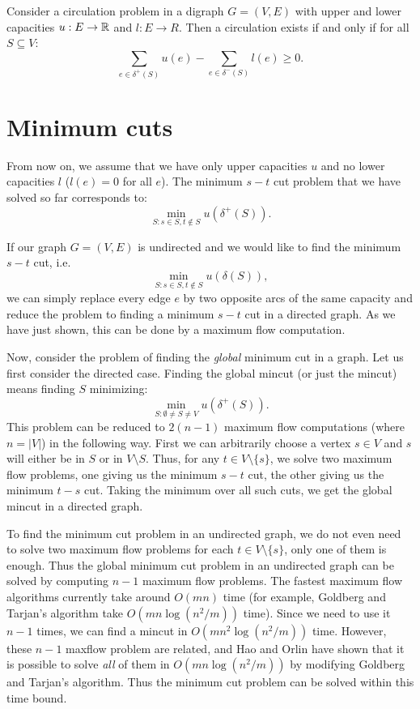 \documentclass[12pt]{article}
\begin{document}
\begin{theorem}
Consider a circulation problem in a digraph $G=(V,E)$ with upper and lower capacities $u: E\rightarrow {\mathbb R}$ and $l: E \rightarrow R$. Then a circulation exists if and only if for all $S\subseteq V$:
$$\sum_{e\in \delta^+(S)} u(e) - \sum_{e\in \delta^-(S)} l(e) \geq 0.$$
\end{theorem}



\section{Minimum cuts}

From now on, we assume that we have only upper capacities $u$ and no
lower capacities $l$ ($l(e)=0$ for all $e$). The minimum $s-t$ cut
problem that we have solved so far corresponds to:
$$\min_{S: s\in S, t\notin S} u(\delta^+(S)).$$

If our graph $G=(V,E)$ is undirected and we would like to find the
minimum $s-t$ cut, i.e.
$$\min_{S: s\in S, t\notin S} u(\delta(S)),$$
we can simply replace every edge $e$ by two opposite arcs of the same
capacity and reduce the problem to finding a minimum $s-t$ cut in a
directed graph. As we have just shown, this can be done by a maximum
flow computation. 

Now, consider the problem of finding the {\it global} minimum cut in a
graph. Let us first consider the directed case. Finding the global
mincut (or just the mincut) means finding $S$ minimizing:
$$\min_{S: \emptyset \neq S \neq V} u(\delta^+(S)).$$ This problem can
be reduced to $2(n-1)$ maximum flow computations (where $n=|V|$) in
the following way. First we can arbitrarily choose a vertex $s\in V$ and $s$
will either be in $S$ or in $V\setminus S$. Thus, for any $t\in
V\setminus \{s\}$, we solve two maximum flow problems, one giving us
the minimum $s-t$ cut, the other giving us the minimum $t-s$
cut. Taking the minimum over all such cuts, we get the global mincut
in a directed graph. 

To find the minimum cut problem in an undirected graph, we do not even
need to solve two maximum flow problems for each $t\in V\setminus
\{s\}$, only one of them is enough. Thus the global minimum cut
problem in an undirected graph can be solved by computing $n-1$
maximum flow problems. 
The fastest maximum flow algorithms currently take around $O(mn)$ time (for example, Goldberg and Tarjan's algorithm
\cite{GoldbergT88} take $O(mn\log(n^2/m))$ time). Since we need to use
it $n-1$ times, we can find a mincut in $O(mn^2\log(n^2/m))$ time.
However, these $n-1$ maxflow problem are related, and Hao and Orlin
\cite{HaoO92} have shown that it is possible to solve {\em all} of
them in $O(mn\log(n^2/m))$ by modifying Goldberg and Tarjan's
algorithm. Thus the minimum cut problem can be solved within this time
bound.
\end{document}

